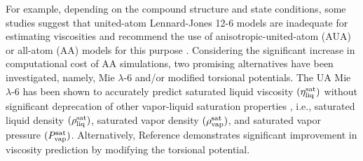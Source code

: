 \documentclass[preprint,review,12pt]{elsarticle}
\begin{document}
	
	
	
	
	
	For example, depending on the compound structure and state conditions, some studies suggest that united-atom Lennard-Jones 12-6 models are inadequate for estimating viscosities and recommend the use of anisotropic-united-atom (AUA) or all-atom (AA) models for this purpose \cite{Allen1997,Payal2012,Mondello1997,Ungerer2007}. Considering the significant increase in computational cost of AA simulations, two promising alternatives have been investigated, namely, Mie $\lambda$-6 and/or modified torsional potentials. The UA Mie $\lambda$-6 has been shown to accurately predict saturated liquid viscosity $(\eta_{\rm liq}^{\rm sat})$ without significant deprecation of other vapor-liquid saturation properties \cite{Gordon2006}, i.e., saturated liquid density $(\rho_{\rm liq}^{\rm sat})$, saturated vapor density $(\rho_{\rm vap}^{\rm sat})$, and saturated vapor pressure $(P_{\rm vap}^{\rm sat})$. Alternatively, Reference  demonstrates significant improvement in viscosity prediction by modifying the torsional potential.  
	
\end{document}

